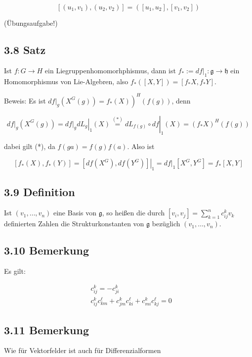 \documentclass[10pt, letterpaper]{article}
\begin{document}
$$
\left[\left(u_{1}, v_{1}\right),\left(u_{2}, v_{2}\right)\right]=\left(\left[u_{1}, u_{2}\right],\left[v_{1}, v_{2}\right]\right)
$$

(Übungsaufgabe!)

\subsection*{3.8 Satz}
Ist $f: G \rightarrow H$ ein Liegruppenhomomorhphismus, dann ist $f_{*}:=\left.d f\right|_{1}: \mathfrak{g} \rightarrow \mathfrak{h}$ ein Homomorphismus von Lie-Algebren, also $f_{*}([X, Y])=\left[f_{*} X, f_{*} Y\right]$.

Beweis: Es ist $\left.\left.d f\right|_{g}\left(X^{G}(g)\right)=f_{*}(X)\right)^{H}(f(g))$, denn

$$
\left.d f\right|_{g}\left(X^{G}(g)\right)=\left.\left.\left.d f\right|_{g} d L_{g}\right|_{1}(X) \stackrel{(*)}{=} d L_{f(g)} \circ d f\right|_{1}(X)=\left(f_{*} X\right)^{H}(f(g))
$$

dabei gilt (*), da $f(g a)=f(g) f(a)$. Also ist

$$
\left[f_{*}(X), f_{*}(Y)\right]=\left.\left[d f\left(X^{G}\right), d f\left(Y^{G}\right)\right]\right|_{1}=\left.d f\right|_{1}\left[X^{G}, Y^{G}\right]=f_{*}[X, Y]
$$

\subsection*{3.9 Definition}
Ist $\left(v_{1}, \ldots, v_{n}\right)$ eine Basis von $\mathfrak{g}$, so heißen die durch $\left[v_{i}, v_{j}\right]=\sum_{k=1}^{n} c_{i j}^{k} v_{k}$ definierten Zahlen die Strukturkonstanten von $\mathfrak{g}$ bezüglich $\left(v_{1}, \ldots, v_{n}\right)$.

\subsection*{3.10 Bemerkung}
Es gilt:

$$
\begin{aligned}
& c_{i j}^{k}=-c_{j i}^{k} \\
& c_{i j}^{k} c_{k m}^{\ell}+c_{j m}^{k} c_{k i}^{\ell}+c_{m i}^{k} c_{k j}^{\ell}=0
\end{aligned}
$$

\subsection*{3.11 Bemerkung}
Wie für Vektorfelder ist auch für Differenzialformen
\end{document}
